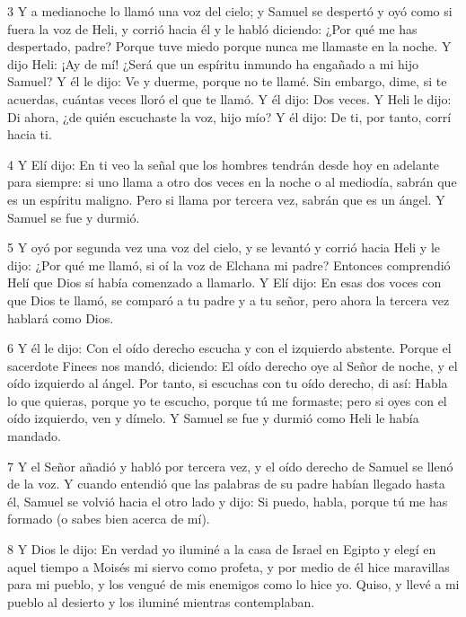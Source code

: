 \par 3 Y a medianoche lo llamó una voz del cielo; y Samuel se despertó y oyó como si fuera la voz de Heli, y corrió hacia él y le habló diciendo: ¿Por qué me has despertado, padre? Porque tuve miedo porque nunca me llamaste en la noche. Y dijo Heli: ¡Ay de mí! ¿Será que un espíritu inmundo ha engañado a mi hijo Samuel? Y él le dijo: Ve y duerme, porque no te llamé. Sin embargo, dime, si te acuerdas, cuántas veces lloró el que te llamó. Y él dijo: Dos veces. Y Heli le dijo: Di ahora, ¿de quién escuchaste la voz, hijo mío? Y él dijo: De ti, por tanto, corrí hacia ti.

\par 4 Y Elí dijo: En ti veo la señal que los hombres tendrán desde hoy en adelante para siempre: si uno llama a otro dos veces en la noche o al mediodía, sabrán que es un espíritu maligno. Pero si llama por tercera vez, sabrán que es un ángel. Y Samuel se fue y durmió.

\par 5 Y oyó por segunda vez una voz del cielo, y se levantó y corrió hacia Heli y le dijo: ¿Por qué me llamó, si oí la voz de Elchana mi padre? Entonces comprendió Helí que Dios sí había comenzado a llamarlo. Y Elí dijo: En esas dos voces con que Dios te llamó, se comparó a tu padre y a tu señor, pero ahora la tercera vez hablará como Dios.

\par 6 Y él le dijo: Con el oído derecho escucha y con el izquierdo abstente. Porque el sacerdote Finees nos mandó, diciendo: El oído derecho oye al Señor de noche, y el oído izquierdo al ángel. Por tanto, si escuchas con tu oído derecho, di así: Habla lo que quieras, porque yo te escucho, porque tú me formaste; pero si oyes con el oído izquierdo, ven y dímelo. Y Samuel se fue y durmió como Heli le había mandado.

\par 7 Y el Señor añadió y habló por tercera vez, y el oído derecho de Samuel se llenó de la voz. Y cuando entendió que las palabras de su padre habían llegado hasta él, Samuel se volvió hacia el otro lado y dijo: Si puedo, habla, porque tú me has formado (o sabes bien acerca de mí).

\par 8 Y Dios le dijo: En verdad yo iluminé a la casa de Israel en Egipto y elegí en aquel tiempo a Moisés mi siervo como profeta, y por medio de él hice maravillas para mi pueblo, y los vengué de mis enemigos como lo hice yo. Quiso, y llevé a mi pueblo al desierto y los iluminé mientras contemplaban.

